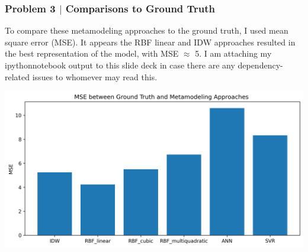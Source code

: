 \documentclass[aspectratio=1610]{beamer}
\begin{document}
\begin{frame}
\frametitle{Problem 3 $|$ Comparisons to Ground Truth}

\footnotesize{To compare these metamodeling approaches to the ground truth, I used mean square error (MSE). It appears the RBF linear and IDW approaches resulted in the best representation of the model, with MSE $\approx$ 5. I am attaching my ipythonnotebook output to this slide deck in case there are any dependency-related issues to whomever may read this.}

\vspace{1em}

\centering
\includegraphics[width = .85\textwidth]{comparison}
\end{frame}
\end{document}

